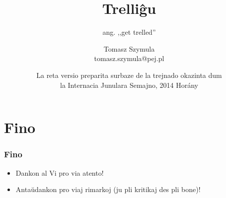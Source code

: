 \documentclass{beamer}
\title{Trelliĝu}
\subtitle{ang. ,,get trelled''}
\author{Tomasz Szymula \\ tomasz.szymula@pej.pl}
\institute[PEJ]{\texttt{[image: bildoj/pej]}}
\date[IJS 2014]{La reta versio preparita surbaze de la trejnado okazinta dum \\la Internacia Junulara Semajno, 2014 Horány}
\begin{document}
  \frame{\titlepage}
 


%










  

\section*{Fino}
  \begin{frame}
    \frametitle{Fino}

	\begin{itemize}
		\item Dankon al Vi pro via atento!
		
		\item Antaŭdankon pro viaj rimarkoj (ju pli kritikaj des pli bone)! 
		
	\end{itemize}		
	
  \end{frame}
\end{document}

